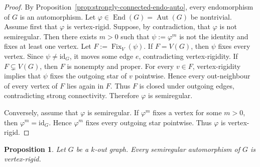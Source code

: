 \documentclass[a4paper,10pt]{amsart}
\theoremstyle{plain}
\newtheorem{proposition}[theorem]{Proposition}
\theoremstyle{definition}
\DeclareMathOperator{\Aut}{Aut}
\DeclareMathOperator{\Fix}{Fix}
\DeclareMathOperator{\End}{End}
\newcommand{\FixV}[1]{\Fix_{V}(#1)}
\newcommand{\id}{\mathrm{id}}
\begin{document}
\begin{proof}
By Proposition~\ref{prop:strongly-connected-endo-auto}, every endomorphism of $G$ is an automorphism. Let $\varphi\in\End(G)=\Aut(G)$ be nontrivial. Assume first that $\varphi$ is vertex-rigid.
Suppose, by contradiction, that $\varphi$ is not semiregular. Then there exists $m>0$ such that
$\psi:=\varphi^m$ is not the identity and fixes at least one vertex. Let $F:=\FixV{\psi}$. If $F=V(G)$, then $\psi$ fixes every vertex. Since $\psi\neq\id_G$, it moves some edge $e$, contradicting vertex-rigidity. If $F\subsetneq V(G)$, then $F$ is nonempty and proper. For every $v\in F$, vertex-rigidity implies
that $\psi$ fixes the outgoing star of $v$ pointwise. Hence every out-neighbour of every vertex of
$F$ lies again in $F$. Thus $F$ is closed under outgoing edges, contradicting strong connectivity.
Therefore $\varphi$ is semiregular.

Conversely, assume that $\varphi$ is semiregular. If $\varphi^m$ fixes a vertex for some $m>0$, then
$\varphi^m=\id_G$. Hence $\varphi^m$ fixes every outgoing star pointwise. Thus $\varphi$ is
vertex-rigid.
\end{proof}


\begin{proposition}\label{prop:semiregular-vertex-rigid}
Let $G$ be a $k$-out graph. Every semiregular automorphism of $G$ is vertex-rigid.
\end{proposition}
\end{document}
